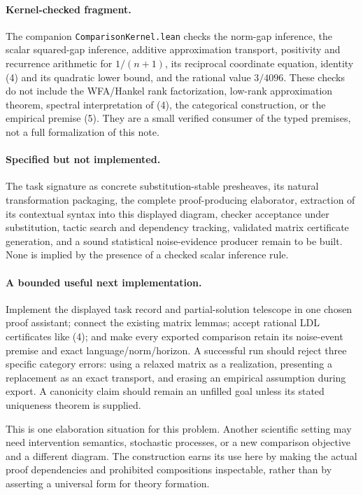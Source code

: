 \documentclass[11pt]{article}
\begin{document}
\paragraph{Kernel-checked fragment.}
The companion \texttt{ComparisonKernel.lean} checks the norm-gap inference,
the scalar squared-gap inference, additive approximation transport,
positivity and recurrence arithmetic for $1/(n+1)$, its reciprocal
coordinate equation, identity (4) and its quadratic lower bound, and the
rational value $3/4096$. These checks do not include the WFA/Hankel rank
factorization, low-rank approximation theorem, spectral interpretation
of (4), the categorical construction, or the empirical premise (5).
They are a small verified consumer of the typed premises, not a full
formalization of this note.

\paragraph{Specified but not implemented.}
The task signature as concrete substitution-stable presheaves, its natural
transformation packaging, the complete proof-producing elaborator,
extraction of its contextual syntax into this displayed diagram,
checker acceptance under substitution, tactic search and dependency tracking,
validated matrix certificate generation, and a sound statistical
noise-evidence producer remain to be built. None is implied by the
presence of a checked scalar inference rule.

\paragraph{A bounded useful next implementation.}
Implement the displayed task record and partial-solution telescope in
one chosen proof assistant; connect the existing matrix lemmas; accept
rational LDL certificates like (4); and make every exported comparison
retain its noise-event premise and exact language/norm/horizon.
A successful run should reject three specific category errors:
using a relaxed matrix as a realization, presenting a replacement as an
exact transport, and erasing an empirical assumption during export.
A canonicity claim should remain an unfilled goal unless its stated
uniqueness theorem is supplied.

This is one elaboration situation for this problem. Another scientific
setting may need intervention semantics, stochastic processes, or a
new comparison objective and a different diagram. The construction earns
its use here by making the actual proof dependencies and prohibited
compositions inspectable, rather than by asserting a universal form for
theory formation.
\end{document}
